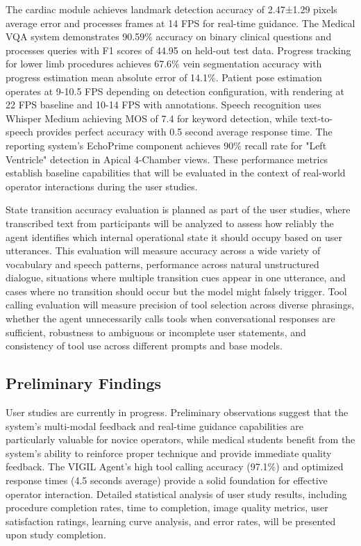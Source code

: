 \documentclass[12pt,a4paper]{article}
\begin{document}
The cardiac module achieves landmark detection accuracy of 2.47±1.29 pixels average error and processes frames at 14 FPS for real-time guidance. The Medical VQA system demonstrates 90.59\% accuracy on binary clinical questions and processes queries with F1 scores of 44.95 on held-out test data. Progress tracking for lower limb procedures achieves 67.6\% vein segmentation accuracy with progress estimation mean absolute error of 14.1\%. Patient pose estimation operates at 9-10.5 FPS depending on detection configuration, with rendering at 22 FPS baseline and 10-14 FPS with annotations. Speech recognition uses Whisper Medium achieving MOS of 7.4 for keyword detection, while text-to-speech provides perfect accuracy with 0.5 second average response time. The reporting system's EchoPrime component achieves 90\% recall rate for "Left Ventricle" detection in Apical 4-Chamber views. These performance metrics establish baseline capabilities that will be evaluated in the context of real-world operator interactions during the user studies.

State transition accuracy evaluation is planned as part of the user studies, where transcribed text from participants will be analyzed to assess how reliably the agent identifies which internal operational state it should occupy based on user utterances. This evaluation will measure accuracy across a wide variety of vocabulary and speech patterns, performance across natural unstructured dialogue, situations where multiple transition cues appear in one utterance, and cases where no transition should occur but the model might falsely trigger. Tool calling evaluation will measure precision of tool selection across diverse phrasings, whether the agent unnecessarily calls tools when conversational responses are sufficient, robustness to ambiguous or incomplete user statements, and consistency of tool use across different prompts and base models.

\subsection{Preliminary Findings}

User studies are currently in progress. Preliminary observations suggest that the system's multi-modal feedback and real-time guidance capabilities are particularly valuable for novice operators, while medical students benefit from the system's ability to reinforce proper technique and provide immediate quality feedback. The VIGIL Agent's high tool calling accuracy (97.1\%) and optimized response times (4.5 seconds average) provide a solid foundation for effective operator interaction. Detailed statistical analysis of user study results, including procedure completion rates, time to completion, image quality metrics, user satisfaction ratings, learning curve analysis, and error rates, will be presented upon study completion.
\end{document}

